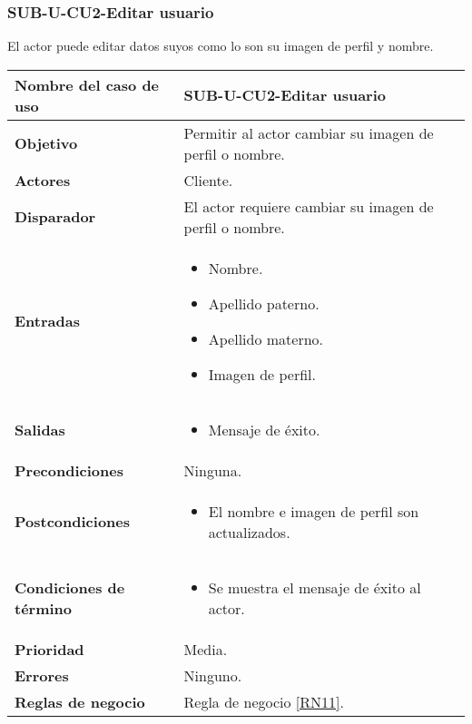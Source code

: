 \subsubsection{SUB-U-CU2-Editar usuario}\label{SUB-U-CU2}
El actor puede editar datos suyos como lo son su imagen de perfil y nombre.

\begin{longtable}{|J{5cm}|J{10.3cm}|}
	\hline
	\textbf{Nombre del caso de uso} &
		SUB-U-CU2-Editar usuario \\ \hline
	\textbf{Objetivo} &
		Permitir al actor cambiar su imagen de perfil o nombre. \\ \hline
	\textbf{Actores} &
		Cliente. \\ \hline 
	\textbf{Disparador} & 
		El actor requiere cambiar su imagen de perfil o nombre.\\ \hline 
	\textbf{Entradas} & 
		\begin{itemize}
				\item Nombre.
				\item Apellido paterno.
				\item Apellido materno.
				\item Imagen de perfil.
		\end{itemize}\\ \hline 
	\textbf{Salidas} & 
		\begin{itemize}
			\item Mensaje de éxito.
		\end{itemize} \\ \hline
	\textbf{Precondiciones} &
		Ninguna.\\ \hline
	\textbf{Postcondiciones} &
		\begin{itemize}
			\item El nombre e imagen de perfil son actualizados.
		\end{itemize} \\ \hline
	\textbf{Condiciones de término} & 
		\begin{itemize}
			\item Se muestra el mensaje de éxito al actor.
		\end{itemize} \\ \hline 
	\textbf{Prioridad} & 
		Media. \\ \hline
	\textbf{Errores} & Ninguno.
		\\ \hline
	\textbf{Reglas de negocio} &  Regla de negocio \ref{RN11}.
		 \\ \hline
\end{longtable}

